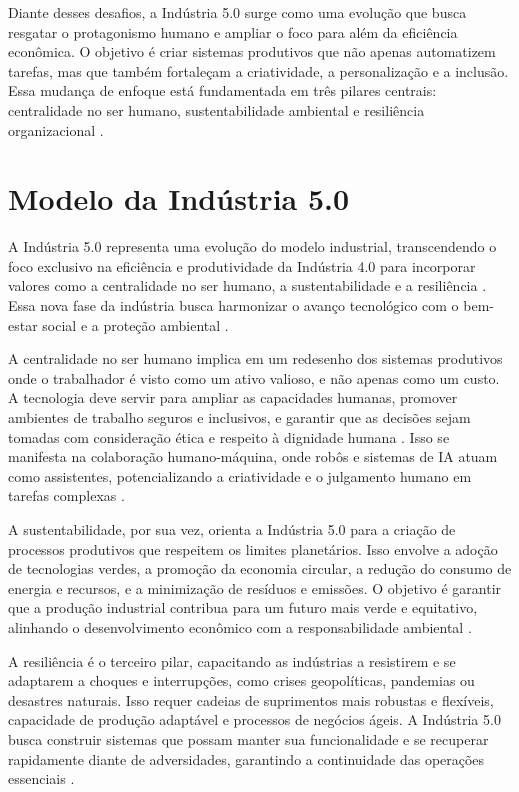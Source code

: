 Diante desses desafios, a Indústria 5.0 surge como uma evolução que busca resgatar o protagonismo humano e ampliar o foco para além da eficiência econômica.
O objetivo é criar sistemas produtivos que não apenas automatizem tarefas, mas que também fortaleçam a criatividade, a personalização e a inclusão.
Essa mudança de enfoque está fundamentada em três pilares centrais: centralidade no ser humano, sustentabilidade ambiental e resiliência organizacional \cite{euCommission2021, Nahavandi2019}.

\section{Modelo da Indústria 5.0}

A Indústria 5.0 representa uma evolução do modelo industrial, transcendendo o foco exclusivo na eficiência e produtividade da Indústria 4.0 para incorporar valores como a centralidade no ser humano, a sustentabilidade e a resiliência \cite{euCommission2021, Xu2021}.
Essa nova fase da indústria busca harmonizar o avanço tecnológico com o bem-estar social e a proteção ambiental \cite{Nahavandi2019}.

A centralidade no ser humano implica em um redesenho dos sistemas produtivos onde o trabalhador é visto como um ativo valioso, e não apenas como um custo.
A tecnologia deve servir para ampliar as capacidades humanas, promover ambientes de trabalho seguros e inclusivos, e garantir que as decisões sejam tomadas com consideração ética e respeito à dignidade humana \cite{Nahavandi2019, TOTH2023}.
Isso se manifesta na colaboração humano-máquina, onde robôs e sistemas de IA atuam como assistentes, potencializando a criatividade e o julgamento humano em tarefas complexas \cite{VALETTE2023}.

A sustentabilidade, por sua vez, orienta a Indústria 5.0 para a criação de processos produtivos que respeitem os limites planetários.
Isso envolve a adoção de tecnologias verdes, a promoção da economia circular, a redução do consumo de energia e recursos, e a minimização de resíduos e emissões.
O objetivo é garantir que a produção industrial contribua para um futuro mais verde e equitativo, alinhando o desenvolvimento econômico com a responsabilidade ambiental \cite{euCommission2021, silva2024}.

A resiliência é o terceiro pilar, capacitando as indústrias a resistirem e se adaptarem a choques e interrupções, como crises geopolíticas, pandemias ou desastres naturais.
Isso requer cadeias de suprimentos mais robustas e flexíveis, capacidade de produção adaptável e processos de negócios ágeis.
A Indústria 5.0 busca construir sistemas que possam manter sua funcionalidade e se recuperar rapidamente diante de adversidades, garantindo a continuidade das operações essenciais \cite{euCommission2021, Khan2023}.

